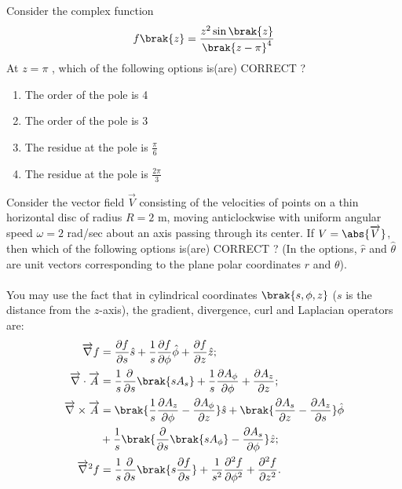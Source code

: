 \item Consider the complex function
\begin{align*}
    f\brak{z} = \frac{z^2\sin\brak{z}}{\brak{z - \pi}^4}
\end{align*}
At $z = \pi$ , which of the following options is(are) CORRECT ?
\begin{enumerate}
    \item The order of the pole is 4
    \item The order of the pole is 3
    \item The residue at the pole is $\frac{\pi}{6}$
    \item The residue at the pole is $\frac{2\pi}{3}$ \\
\end{enumerate}
\item Consider the vector field $\overrightarrow{V}$ consisting of the velocities of points on a thin horizontal disc of radius $R = 2$ m, moving anticlockwise with uniform angular speed $\omega = 2$ rad/sec about an axis passing through its center. If $V = \abs{\overrightarrow{V}}$, then which of the following options is(are) CORRECT ? (In the options, $\hat{r}$ and $\hat{\theta}$ are unit vectors corresponding to the plane polar coordinates $r$ and $\theta$).\\\\
You may use the fact that in cylindrical coordinates $\brak{s, \phi, z}$ ($s$ is the distance from the $z$-axis), the gradient, divergence, curl and Laplacian operators are:
\begin{align*}
    \overrightarrow{\nabla}f & = \frac{\partial f}{\partial s}\hat{s} + \frac{1}{s}\frac{\partial f}{\partial \phi}\hat{\phi} + \frac{\partial f}{\partial z}\hat{z}; \\
\overrightarrow{\nabla}\cdot\overrightarrow{A} & = \frac{1}{s}\frac{\partial}{\partial s}\brak{sA_s} + \frac{1}{s}\frac{\partial A_{\phi}}{\partial \phi} + \frac{\partial A_z}{\partial z}; \\
\overrightarrow{\nabla}\times\overrightarrow{A} & = \brak{\frac{1}{s} \frac{\partial A_z}{\partial \phi} - \frac{\partial A_{\phi}}{\partial z}}\hat{s} + \brak{\frac{\partial A_s}{\partial z} - \frac{\partial A_z}{\partial s}}\hat{\phi} \\
& + \frac{1}{s}\brak{\frac{\partial}{\partial s}\brak{sA_{\phi}} - \frac{\partial A_s}{\partial \phi}}\hat{z}; \\
\overrightarrow{\nabla}^2f & = \frac{1}{s}\frac{\partial}{\partial s}\brak{s \frac{\partial f}{\partial s}} + \frac{1}{s^2}\frac{\partial^2 f}{\partial \phi^2} + \frac{\partial^2 f}{\partial z^2}.
\end{align*}
